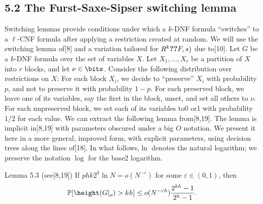 \subsection*{5.2 The Furst-Saxe-Sipser switching lemma}
Switching lemmas provide conditions under which a $k$-DNF formula ``switches'' to a $\ell$-CNF formula after applying a restriction created at random. We will use the switching lemma of[8] and a variation tailored for $R^k\Ref(F,s)$ due to[10].
Let $G$ be a $k$-DNF formula over the set of variables $X$. Let $X_1,\ldots,X_r$ be a partition of $X$ into $r$ blocks, and let $\nu\in\bits$. Consider the following distribution over restrictions on $X$: For each block $X_i$, we decide to ``preserve'' $X_i$ with probability $p$, and not to preserve it with probability $1-p$. For each preserved block, we leave one of its variables, say the first in the block, unset, and set all others to $\nu$. For each unpreserved block, we set each of its variables to0 or1 with probability $1/2$ for each value.
We can extract the following lemma from[8,19]. The lemma is implicit in[8,19] with parameters obscured under a big $O$ notation. We present it here in a more general, improved form, with explicit parameters, using decision trees along the lines of[18]. In what follows,$\ln$ denotes the natural logarithm; we preserve the notation $\log$ for the base2 logarithm.
\begin{originalresult}{Lemma 5.3 (see[8,19])}
If $phk2^k\ln N=o(N^{-\varepsilon})$ for some $\varepsilon\in(0,1)$, then
\[\mathbb P[\height(G|_\rho)>kh]\le o(N^{-\varepsilon h})\frac{2^{kh}-1}{2^h-1}.\]
\end{originalresult}
